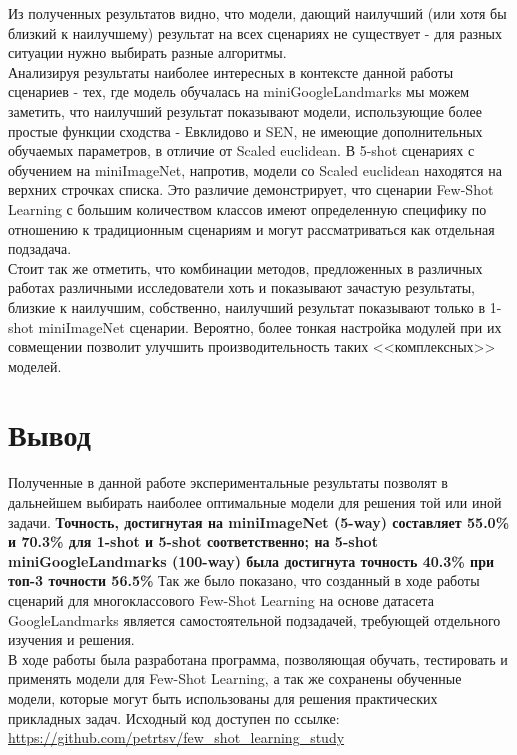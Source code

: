 \documentclass[a4paper, 12pt]{report}
\begin{document}
Из полученных результатов видно, что модели, дающий наилучший (или хотя бы близкий к наилучшему) результат на всех сценариях не существует - для разных ситуации нужно выбирать разные алгоритмы. \\

Анализируя результаты наиболее интересных в контексте данной работы сценариев - тех, где модель обучалась на miniGoogleLandmarks мы можем заметить, что наилучший результат показывают модели, использующие более простые функции сходства - Евклидово и SEN, не имеющие дополнительных обучаемых параметров, в отличие от Scaled euclidean. В 5-shot сценариях с обучением на miniImageNet, напротив, модели со Scaled euclidean находятся на верхних строчках списка. Это различие демонстрирует, что сценарии Few-Shot Learning с большим количеством классов имеют определенную специфику по отношению к традиционным сценариям и могут рассматриваться как отдельная подзадача. \\

Стоит так же отметить, что комбинации методов, предложенных в различных работах различными исследователи хоть и показывают зачастую результаты, близкие к наилучшим, собственно, наилучший результат показывают только в 1-shot miniImageNet сценарии. Вероятно, более тонкая настройка модулей при их совмещении позволит улучшить производительность таких <<комплексных>> моделей.


\chapter{Вывод}

Полученные в данной работе экспериментальные результаты позволят в дальнейшем выбирать наиболее оптимальные модели для решения той или иной задачи. \textbf{Точность, достигнутая на miniImageNet (5-way) составляет 55.0\% и 70.3\% для 1-shot и 5-shot соответственно; на 5-shot miniGoogleLandmarks (100-way) была достигнута точность 40.3\% при топ-3 точности 56.5\%} Так же было показано, что созданный в ходе работы сценарий для многоклассового Few-Shot Learning на основе датасета GoogleLandmarks \cite{google} является самостоятельной подзадачей, требующей отдельного изучения и решения. \\

В ходе работы была разработана программа, позволяющая обучать, тестировать и применять модели для Few-Shot Learning, а так же сохранены обученные модели, которые могут быть использованы для решения практических прикладных задач. Исходный код доступен по ссылке: \url{https://github.com/petrtsv/few_shot_learning_study}\\
\end{document}
